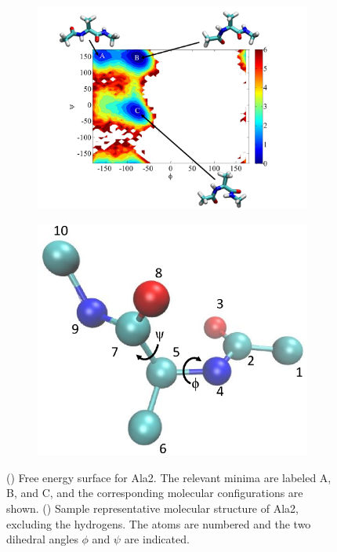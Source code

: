 \begin{figure}[t]
\centering
\begin{subfigure}{0.6\textwidth}
\includegraphics[width=\textwidth]{FES}
\caption{}
\label{subfig:FES}
\end{subfigure}
\begin{subfigure}{0.3\textwidth}
\includegraphics[width=\textwidth]{molecule_labeled2}
\caption{}
\label{subfig:ala_config}
\end{subfigure}
\caption[Alanine dipeptide free energy surface and representative molecular configuration]{() Free energy surface for Ala2. The relevant minima are labeled A, B, and C, and the corresponding molecular configurations are shown.
() Sample representative molecular structure of Ala2, excluding the hydrogens. The atoms are numbered and the two dihedral angles $\phi$ and $\psi$ are indicated.}
\label{fig:ala_fes}
\end{figure}


